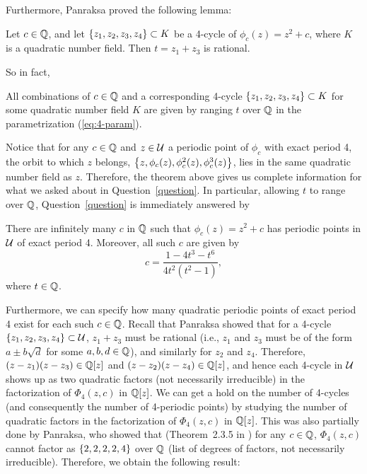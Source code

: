 Furthermore, Panraksa proved the following lemma:

\begin{lemma}
  \label{lem:z1+z3}
  Let $c \in \mathbb{Q}$, and let $\left\{z_1, z_2, z_3, z_4\right\} \subset K$ be a
  4-cycle of $\phi_c(z) = z^2 + c$, where $K$ is a quadratic number
  field. Then $t = z_1 + z_3$ is rational.
\end{lemma}

So in fact,

\begin{theorem} 
  \label{th:all}
  All combinations of $c \in \mathbb{Q}$ and a corresponding 4-cycle
  $\left\{z_1, z_2, z_3, z_4\right\} \subset K$ for some quadratic number field
  $K$ are given by ranging $t$ over $\mathbb{Q}$ in the parametrization
  (\ref{eq:4-param}).
\end{theorem}

Notice that for any $c \in \mathbb{Q}$ and $z \in \mathcal{U}$ a periodic point of
$\phi_c$ with exact period 4, the orbit to which $z$ belongs, $\left\{z,
  \phi_c(z), \phi_c^2(z), \phi_c^3(z)\right\}$, lies in the same quadratic
number field as $z$. Therefore, the theorem above gives us complete
information for what we asked about in Question~\ref{question}. In
particular, allowing $t$ to range over $\mathbb{Q}$, Question~\ref{question}
is immediately answered by

\begin{corollary}
  There are infinitely many $c$ in $\mathbb{Q}$ such that $\phi_c(z) = z^2 +
  c$ has periodic points in $\mathcal{U}$ of exact period 4. Moreover, all such
  $c$ are given by
  \[
  \label{eq:c-param}
  c = \frac{1 - 4t^3 - t^6}{4t^2(t^2 - 1)},
  \]
  where $t \in \mathbb{Q}$.
\end{corollary}

Furthermore, we can specify how many quadratic periodic points of
exact period 4 exist for each such $c \in \mathbb{Q}$. Recall that Panraksa
showed that for a 4-cycle $\left\{z_1, z_2, z_3, z_4\right\} \subset \mathcal{U}$, $z_1
+ z_3$ must be rational (i.e., $z_1$ and $z_3$ must be of the form $a
\pm b \sqrt{d}$ for some $a, b, d \in \mathbb{Q}$), and similarly for $z_2$
and $z_4$. Therefore, $(z - z_1)(z - z_3) \in \mathbb{Q}[z]$ and $(z - z_2)(z
- z_4) \in \mathbb{Q}[z]$, and hence each 4-cycle in $\mathcal{U}$ shows up as two
quadratic factors (not necessarily irreducible) in the factorization
of $\Phi_4(z, c)$ in $\mathbb{Q}[z]$. We can get a hold on the number of
4-cycles (and consequently the number of 4-periodic points) by
studying the number of quadratic factors in the factorization of
$\Phi_4(z, c)$ in $\mathbb{Q}[z]$. This was also partially done by Panraksa,
who showed that (Theorem~2.3.5 in \cite{MR2982105}) for any $c \in
\mathbb{Q}$, $\Phi_4(z, c)$ cannot factor as $\left\{2, 2, 2, 2, 4\right\}$ over $\mathbb{Q}$
(list of degrees of factors, not necessarily irreducible). Therefore,
we obtain the following result:

